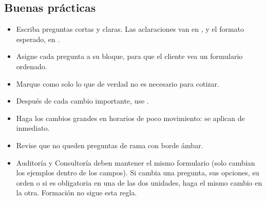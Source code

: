\subsection{Buenas prácticas}

\begin{itemize}
  \item Escriba preguntas cortas y claras. Las aclaraciones van en ,
        y el formato esperado, en .
  \item Asigne cada pregunta a su bloque, para que el cliente vea un formulario ordenado.
  \item Marque como  solo lo que de verdad no es necesario para cotizar.
  \item Después de cada cambio importante, use .
  \item Haga los cambios grandes en horarios de poco movimiento: se aplican de inmediato.
  \item Revise que no queden preguntas de rama con borde ámbar.
  \item Auditoría y Consultoría deben mantener el mismo formulario (solo cambian los ejemplos
        dentro de los campos). Si cambia una pregunta, sus opciones, su orden o si es
        obligatoria en una de las dos unidades, haga el mismo cambio en la otra. Formación no
        sigue esta regla.
\end{itemize}
